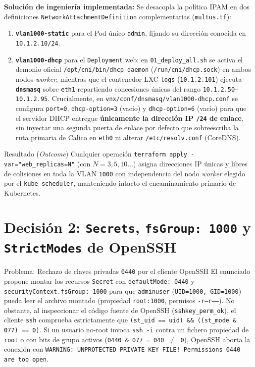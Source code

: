 \textbf{Solución de ingeniería implementada:}
Se desacopla la política IPAM en dos definiciones \texttt{NetworkAttachmentDefinition} complementarias (\texttt{multus.tf}):
\begin{enumerate}
  \item \textbf{\texttt{vlan1000-static}} para el Pod único \texttt{admin}, fijando su dirección conocida en \texttt{10.1.2.10/24}.
  \item \textbf{\texttt{vlan1000-dhcp}} para el \texttt{Deployment} web: en \texttt{01\_deploy\_all.sh} se activa el demonio oficial \texttt{/opt/cni/bin/dhcp daemon} (\texttt{/run/cni/dhcp.sock}) en ambos nodos \textit{worker}, mientras que el contenedor LXC \texttt{logs} (\texttt{10.1.2.101}) ejecuta \textbf{\texttt{dnsmasq}} sobre \texttt{eth1} repartiendo concesiones únicas del rango \texttt{10.1.2.50--10.1.2.95}. Crucialmente, en \texttt{vnx/conf/dnsmasq/vlan1000-dhcp.conf} se configura \texttt{port=0}, \texttt{dhcp-option=3} (vacío) y \texttt{dhcp-option=6} (vacío) para que el servidor DHCP entregue \textbf{únicamente la dirección IP \texttt{/24} de enlace}, sin inyectar una segunda puerta de enlace por defecto que sobreescriba la ruta primaria de Calico en \texttt{eth0} ni alterar \texttt{/etc/resolv.conf} (CoreDNS).
\end{enumerate}

\begin{outcomebox}{Resultado (\textit{Outcome})}
Cualquier operación \texttt{terraform apply -var="web\_replicas=N"} (con $N = 3, 5, 10\dots$) asigna direcciones IP únicas y libres de colisiones en toda la VLAN \texttt{1000} con independencia del nodo \textit{worker} elegido por el \texttt{kube-scheduler}, manteniendo intacto el encaminamiento primario de Kubernetes.
\end{outcomebox}

\section{Decisión 2: \texttt{Secrets}, \texttt{fsGroup: 1000} y \texttt{StrictModes} de OpenSSH}

\begin{decisionbox}{Problema: Rechazo de claves privadas \texttt{0440} por el cliente OpenSSH}
El enunciado propone montar los recursos \texttt{Secret} con \texttt{defaultMode: 0440} y \texttt{securityContext.fsGroup: 1000} para que \texttt{adminuser} (\texttt{UID=1000, GID=1000}) pueda leer el archivo montado (propiedad \texttt{root:1000}, permisos \texttt{-r--r-----}). No obstante, al inspeccionar el código fuente de OpenSSH (\texttt{sshkey\_perm\_ok}), el cliente \texttt{ssh} comprueba estrictamente que \texttt{(st\_uid == uid) \&\& ((st\_mode \& 077) == 0)}. Si un usuario no-root invoca \texttt{ssh -i} contra un fichero propiedad de \texttt{root} o con bits de grupo activos (\texttt{0440 \& 077 = 040 $\neq$ 0}), OpenSSH aborta la conexión con \texttt{WARNING: UNPROTECTED PRIVATE KEY FILE! Permissions 0440 are too open}.
\end{decisionbox}

